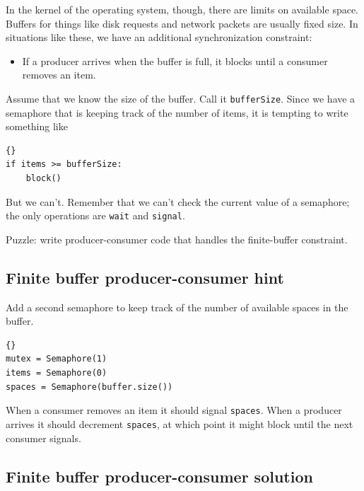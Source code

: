 \documentclass{book}
\newcommand{\clearemptydoublepage}{\newpage\cleardoublepage}
\begin{document}
In the kernel of the operating system, though, there are
limits on available space.  Buffers for things like disk
requests and network packets are usually fixed size.  In
situations like these, we have an additional synchronization
constraint:

\begin{itemize}

\item If a producer arrives when the buffer is full, it
blocks until a consumer removes an item.

\end{itemize}

Assume that we know the size of the buffer.  Call it
{\tt bufferSize}.  Since we have a semaphore that is keeping
track of the number of items, it is tempting to write something
like 

\begin{lstlisting}[title={Broken finite buffer solution}]{}
if items >= bufferSize:
    block()
\end{lstlisting}

But we can't.  Remember that we can't check the current
value of a semaphore; the only operations are {\tt wait}
and {\tt signal}.

Puzzle: write producer-consumer code that handles the finite-buffer
constraint.

\clearemptydoublepage
\subsection{Finite buffer producer-consumer hint}

Add a second semaphore to keep track of the number of
available spaces in the buffer.

\begin{lstlisting}[title={Finite-buffer producer-consumer initialization}]{}
mutex = Semaphore(1)
items = Semaphore(0)
spaces = Semaphore(buffer.size())
\end{lstlisting}

When a consumer removes an item it should signal {\tt spaces}.
When a producer arrives it should decrement {\tt spaces}, at
which point it might block until the next consumer signals.


\clearemptydoublepage
\subsection{Finite buffer producer-consumer solution}
\end{document}
